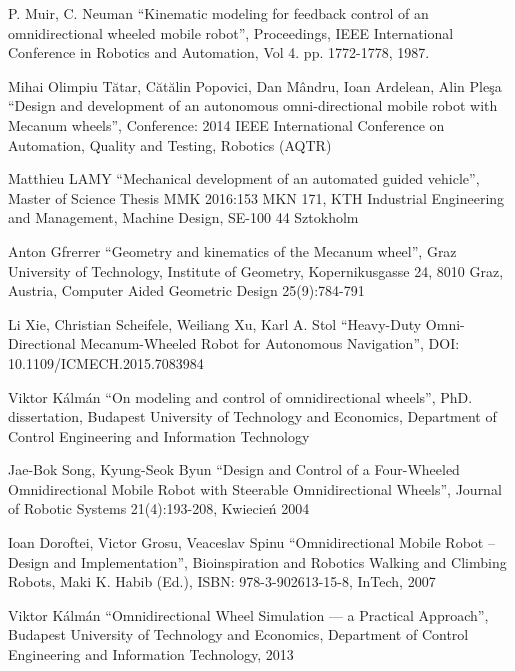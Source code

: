 \begin{thebibliography}{0}

P. Muir, C. Neuman ``Kinematic modeling for feedback control of an omnidirectional wheeled mobile robot'', 
Proceedings, IEEE International Conference in Robotics and Automation, 
Vol 4. pp. 1772-1778, 1987.

Mihai Olimpiu Tătar, Cătălin Popovici, Dan Mândru, Ioan Ardelean, Alin Pleşa ``Design and development of an autonomous omni-directional mobile robot with Mecanum wheels'',
Conference: 2014 IEEE International Conference on Automation, Quality and Testing, Robotics (AQTR)

Matthieu LAMY ``Mechanical development of an automated guided vehicle'',
Master of Science Thesis MMK 2016:153 MKN 171,
KTH Industrial Engineering and Management,
Machine Design,
SE-100 44 Sztokholm

Anton Gfrerrer ``Geometry and kinematics of the Mecanum wheel'',
Graz University of Technology, Institute of Geometry, Kopernikusgasse 24, 8010 Graz, Austria,
Computer Aided Geometric Design 25(9):784-791

Li Xie, Christian Scheifele, Weiliang Xu, Karl A. Stol ``Heavy-Duty Omni-Directional Mecanum-Wheeled Robot for Autonomous Navigation'',
DOI: 10.1109/ICMECH.2015.7083984

Viktor Kálmán ``On modeling and control of omnidirectional wheels'',
PhD. dissertation, Budapest University of Technology and Economics,
Department of Control Engineering and Information Technology

Jae-Bok Song, Kyung-Seok Byun
``Design and Control of a Four-Wheeled Omnidirectional Mobile Robot with Steerable Omnidirectional Wheels'',
Journal of Robotic Systems 21(4):193-208, Kwiecień 2004

Ioan Doroftei, Victor Grosu, Veaceslav Spinu
``Omnidirectional Mobile Robot – Design and Implementation'',
Bioinspiration and Robotics Walking and Climbing Robots, Maki K. Habib (Ed.), ISBN: 978-3-902613-15-8, InTech,
2007

Viktor Kálmán ``Omnidirectional Wheel Simulation --- a Practical Approach'',
Budapest University of Technology and Economics, 
Department of Control Engineering and Information Technology,
2013


\end{thebibliography}
